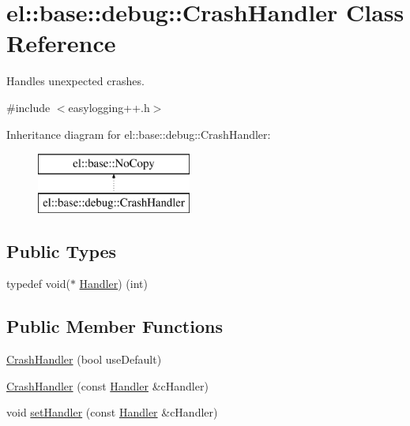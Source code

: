 \hypertarget{classel_1_1base_1_1debug_1_1_crash_handler}{}\section{el\+:\+:base\+:\+:debug\+:\+:Crash\+Handler Class Reference}
\label{classel_1_1base_1_1debug_1_1_crash_handler}


Handles unexpected crashes.  




{\ttfamily \#include $<$easylogging++.\+h$>$}

Inheritance diagram for el\+:\+:base\+:\+:debug\+:\+:Crash\+Handler\+:\begin{figure}[H]
\begin{center}
\leavevmode
\includegraphics[height=2.000000cm]{classel_1_1base_1_1debug_1_1_crash_handler}
\end{center}
\end{figure}
\subsection*{Public Types}
\begin{DoxyCompactItemize}
\item 
typedef void($\ast$ \hyperlink{classel_1_1base_1_1debug_1_1_crash_handler_aebf80d2fd5180d9c56db5a7e9abc7ad9}{Handler}) (int)
\end{DoxyCompactItemize}
\subsection*{Public Member Functions}
\begin{DoxyCompactItemize}
\item 
\hyperlink{classel_1_1base_1_1debug_1_1_crash_handler_a1d1e1a77bb6c37b1fbb39ecf94b38983}{Crash\+Handler} (bool use\+Default)
\item 
\hyperlink{classel_1_1base_1_1debug_1_1_crash_handler_a9fbf8df7a292fcbeabfb87b241c83f78}{Crash\+Handler} (const \hyperlink{classel_1_1base_1_1debug_1_1_crash_handler_aebf80d2fd5180d9c56db5a7e9abc7ad9}{Handler} \&c\+Handler)
\item 
void \hyperlink{classel_1_1base_1_1debug_1_1_crash_handler_abd1d3d1ad5f1de2d40c39dd0542c26d4}{set\+Handler} (const \hyperlink{classel_1_1base_1_1debug_1_1_crash_handler_aebf80d2fd5180d9c56db5a7e9abc7ad9}{Handler} \&c\+Handler)
\end{DoxyCompactItemize}



